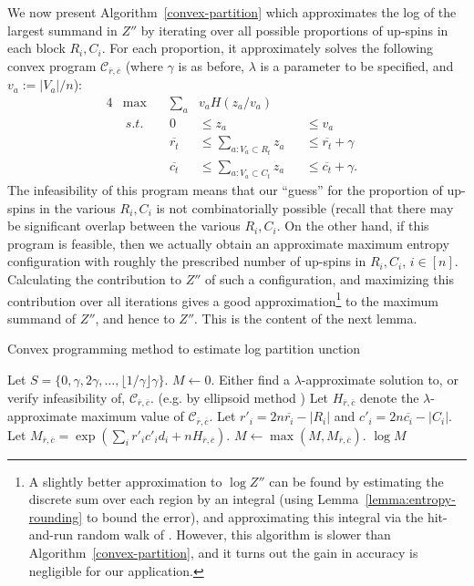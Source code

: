 \documentclass[final, 12pt]{colt2018}
\theoremstyle{definition}
\theoremstyle{plain}
\begin{document}
We now
present Algorithm~\ref{convex-partition}
which approximates the log of the largest summand in $Z''$ by iterating over all possible proportions of up-spins in each block $R_i, C_i$. For each proportion, it 
approximately solves the following convex program $\mathcal{C}_{\overline{r},\overline{c}}$ (where $\gamma$ is as before, $\lambda$ is a parameter to be specified, and $v_a := |V_a|/n$):
\begin{alignat*}{4}
&\max\quad &\sum_a &v_a H(z_a/v_a)\\
&\ s.t.\quad&0 &\le z_a &&\le v_a & \\
&&\overline{r_t} &\le \sum_{a : V_a \subset R_t} z_a &&\le \overline{r_t} + \gamma  \\
&&\overline{c_t} &\le \sum_{a : V_a \subset C_t} z_a &&\le \overline{c_t} + \gamma.
\end{alignat*}
The infeasibility of this program means that our ``guess'' for the proportion of up-spins in the various $R_i,C_i$ is not combinatorially possible (recall that there may be significant overlap between the various $R_i,C_i$. On the other hand, if this program is feasible, then we actually obtain an approximate maximum entropy configuration with roughly the prescribed number of up-spins in $R_i,C_i$, $i\in[n]$. Calculating the contribution to $Z''$ of such a configuration, and maximizing this contribution over all iterations gives a good approximation\footnote{A slightly
better approximation to $\log Z''$ can be found by 
estimating the discrete sum over each region by an integral (using Lemma~\ref{lemma:entropy-rounding} to bound the error), and approximating this integral via the hit-and-run random walk of \citep{lovasz2006fast}. However, this algorithm
is slower than Algorithm~\ref{convex-partition}, and it turns out the gain in accuracy is negligible for our application.}\label{footnote}
to the maximum summand of $Z''$, and hence to $Z''$. This is the content of the next lemma. 
\begin{algorithm}
\caption{Convex programming method to estimate log partition unction}
\label{convex-partition}
\begin{algorithmic}
\State Let $S = \{0, \gamma, 2\gamma, \ldots, \lfloor 1/\gamma \rfloor \gamma \}$.
\State $M \gets 0$.
\State Either find a $\lambda$-approximate solution to, or verify infeasibility of, $\mathcal{C}_{\overline{r},\overline{c}}$. (e.g. by ellipsoid method \citep{gls}) 
\State Let $H_{\overline r,\overline c}$ denote the %
$\lambda$-approximate maximum value of $\mathcal{C}_{\overline{r},\overline{c}}$.
\State Let $r'_i = 2n \overline{r_i} - |R_i|$ and $c'_i = 2n \overline{c_i} - |C_i|$.
\State Let $M_{\overline r,\overline c} = \exp\left(\sum_i r'_i c'_i d_i +  n H_{\overline{r},\overline{c}}\right)$.
\State $M \gets \max(M, M_{\overline r,\overline c})$.
\EndIf
\EndFor
\State \Return $\log{M}$
\end{algorithmic}
\end{algorithm}
\end{document}

